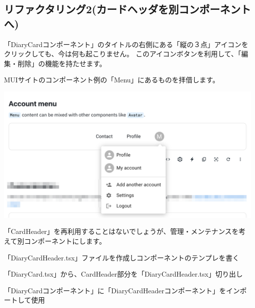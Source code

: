 \clearpage


\subsection{リファクタリング2(カードヘッダを別コンポーネントへ)}
\keeplastskip{
  \label{sec:3-3-6}
  \label{sec-0336}
  \par\nobreak
}

「DiaryCardコンポーネント」のタイトルの右側にある「縦の３点」アイコンをクリックしても、今は何も起こりません。
このアイコンボタンを利用して、「編集・削除」の機能を持たせます。

MUIサイトのコンポーネント例の「Menu」にあるものを拝借します。

\begin{reviewimage}%
\includegraphics[width=0.6\maxwidth]{./images/03-todo-with-react/mui010-card-Menu.png}%
\label{image:03-todo-with-react:mui010-card-Menu}
\end{reviewimage}
\vspace*{\baselineskip}

「CardHeader」を再利用することはないでしょうが、管理・メンテナンスを考えて別コンポーネントにします。

\vspace*{\baselineskip}

\begin{starterenumerate}
\item 「DiaryCardHeader.tsx」ファイルを作成しコンポーネントのテンプレを書く
\item 「DiaryCard.tsx」から、CardHeader部分を「DiaryCardHeader.tsx」切り出し
\item 「DiaryCardコンポーネント」に「DiaryCardHeaderコンポーネント」をインポートして使用
\end{starterenumerate}

